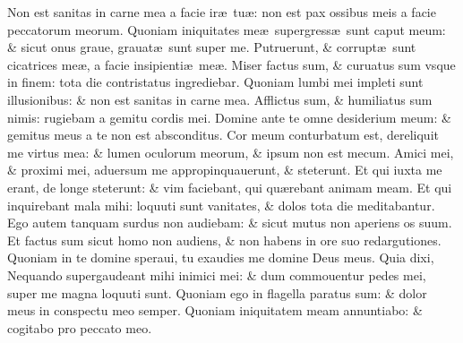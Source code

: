 \documentclass[a5paper,10pt]{book}
\def\ae{æ}
\begin{document}
\begin{multicols*}{2}
\newline \color{red} N\color{black}on est sanitas in carne mea a facie ir\ae \ tu\ae : non est pax ossibus meis a facie peccatorum meorum.
\newline \color{red} Q\color{black}uoniam iniquitates me\ae \ supergress\ae \ sunt caput meum: \& sicut onus graue, grauat\ae \ sunt super me.
\newline \color{red} P\color{black}utruerunt, \& corrupt\ae \ sunt cicatrices me\ae , a facie insipienti\ae \ me\ae .
\newline \color{red} M\color{black}iser factus sum, \& curuatus sum vsque in finem: tota die contristatus ingrediebar.
\newline \color{red} Q\color{black}uoniam lumbi mei impleti sunt illusionibus: \& non est sanitas in carne mea.
\newline \color{red} A\color{black}fflictus sum, \& humiliatus sum nimis: rugiebam a gemitu cordis mei.
\newline \color{red} D\color{black}omine ante te omne desiderium meum: \& gemitus meus a te non est absconditus.
\newline \color{red} C\color{black}or meum conturbatum est, dereliquit me virtus mea: \& lumen oculorum meorum, \& ipsum non est mecum.
\newline \color{red} A\color{black}mici mei, \& proximi mei, aduersum me appropinquauerunt, \& steterunt.
\newline \color{red} E\color{black}t qui iuxta me erant, de longe steterunt: \& vim faciebant, qui qu\ae rebant animam meam.
\newline \color{red} E\color{black}t qui inquirebant mala mihi: loquuti sunt vanitates, \& dolos tota die meditabantur.
\newline \color{red} E\color{black}go autem tanquam surdus non audiebam: \& sicut mutus non aperiens os suum.
\newline \color{red} E\color{black}t factus sum sicut homo non audiens, \& non habens in ore suo redargutiones.
\newline \color{red} Q\color{black}uoniam in te domine speraui, tu exaudies me domine Deus meus.
\newline \color{red} Q\color{black}uia dixi, Nequando supergaudeant mihi inimici mei: \& dum commouentur pedes mei, super me magna loquuti sunt.
\newline \color{red} Q\color{black}uoniam ego in flagella paratus sum: \& dolor meus in conspectu meo semper.
\newline \color{red} Q\color{black}uoniam iniquitatem meam annuntiabo: \& cogitabo pro peccato meo.

\end{multicols*}
\end{document}
